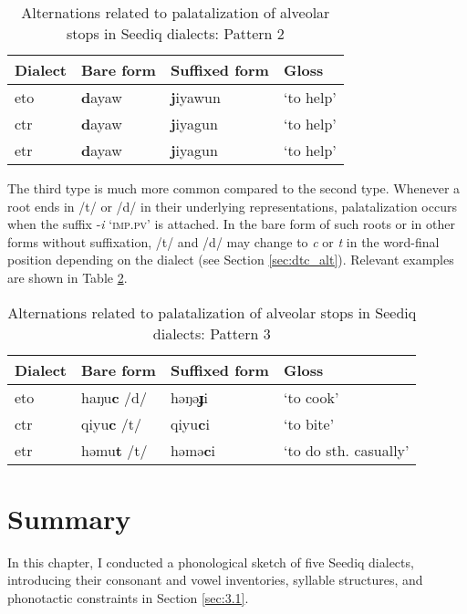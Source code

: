 \begin{table}[!htbp]
\centering
\caption{Alternations related to palatalization of alveolar stops in Seediq dialects: Pattern 2}
\label{tab:cjtd_alt_2}
\begin{tabular}{llll}
\hline
Dialect   & Bare form & Suffixed form & Gloss     \\ \hline
\acl{eto} & \textbf{d}ayaw     & \textbf{j}iyawun      & `to help' \\
\acl{ctr} & \textbf{d}ayaw     & \textbf{j}iyagun      & `to help' \\
\acl{etr} & \textbf{d}ayaw     & \textbf{j}iyagun      & `to help' \\ \hline
\end{tabular}
\end{table}

The third type is much more common compared to the second type. Whenever a root ends in /t/ or /d/ in their underlying representations, palatalization occurs when the suffix -\textit{i} `\textsc{imp.pv}' is attached. In the bare form of such roots or in other forms without suffixation, /t/ and /d/ may change to \textit{c} or \textit{t} in the word-final position depending on the dialect (see Section \ref{sec:dtc_alt}). Relevant examples are shown in Table \ref{tab:cjtd_alt_3}.

\begin{table}[!htbp]
\centering
\caption{Alternations related to palatalization of alveolar stops in Seediq dialects: Pattern 3}
\label{tab:cjtd_alt_3}
\begin{tabular}{llll}
\hline
Dialect   & Bare form & Suffixed form & Gloss                 \\ \hline
\acl{eto} & haŋu\textbf{c} /d/    & həŋə\textbf{ɟ}i       & `to cook'             \\
\acl{ctr} & qiyu\textbf{c} /t/    & qiyu\textbf{c}i       & `to bite'             \\
\acl{etr} & həmu\textbf{t} /t/    & həmə\textbf{c}i       & `to do sth. casually' \\ \hline
\end{tabular}
\end{table}

\section{Summary}

In this chapter, I conducted a phonological sketch of five Seediq dialects, introducing their consonant and vowel inventories, syllable structures, and phonotactic constraints in Section \ref{sec:3.1}. 


